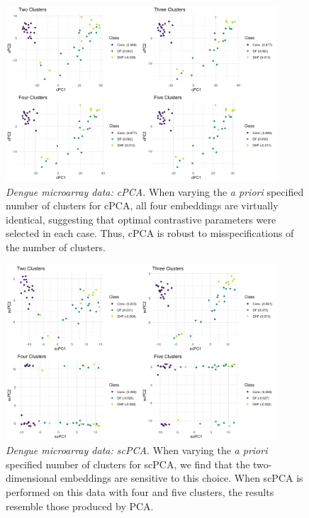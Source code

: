 \begin{figure}[!htbp]
    \centering
    \includegraphics[width=0.9\textwidth]{figures/dengue_cpca_centers.png}
    \caption{
    {\em Dengue microarray data: cPCA.}
    When varying the \textit{a priori} specified number of clusters for cPCA, all four embeddings are virtually identical, suggesting that optimal contrastive parameters were selected in each case. Thus, cPCA is robust to misspecifications of the number of clusters.}
    \label{fig:dengue_cpca_centers}
\end{figure}

\begin{figure}[!htbp]
    \centering
    \includegraphics[width=0.9\textwidth]{figures/dengue_scpca_centers.png}
    \caption{
    {\em Dengue microarray data: scPCA.}
    When varying the \textit{a priori} specified number of clusters for scPCA, we find that the two-dimensional embeddings are sensitive to this choice. When scPCA is performed on this data with four and five clusters, the results resemble those produced by PCA.}
    \label{fig:dengue_scpca_centers}
\end{figure}

